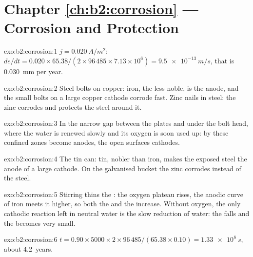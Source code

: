 \section*{Chapter \ref{ch:b2:corrosion} --- Corrosion and Protection}

\begin{solution}{exo:b2:corrosion:1}
$j = \qty{0.020}{A/m^2}$: $de/dt = 0.020 \times 65.38/(2 \times 96\,485 \times 7.13
\times 10^6) = \qty{9.5e-13}{m/s}$, that is \qty{0.030}{mm} per year.
\end{solution}

\begin{solution}{exo:b2:corrosion:2}
Steel bolts on copper: iron, the less noble, is the anode, and the small bolts
on a large copper cathode corrode fast. Zinc nails in steel: the zinc corrodes
and protects the steel around it.
\end{solution}

\begin{solution}{exo:b2:corrosion:3}
In the narrow gap between the plates and under the bolt head, where the water
is renewed slowly and its oxygen is soon used up: by 
these confined zones become anodes, the open surfaces cathodes.
\end{solution}

\begin{solution}{exo:b2:corrosion:4}
The tin can: tin, nobler than iron, makes the exposed steel the anode of a
large cathode. On the galvanised bucket the zinc corrodes instead of the
steel.
\end{solution}

\begin{solution}{exo:b2:corrosion:5}
Stirring thins the : the oxygen plateau rises, the anodic curve
of iron meets it higher, so both the  and the  increase. Without oxygen, the only cathodic reaction left in neutral
water is the slow reduction of water: the  falls and the
 becomes very small.
\end{solution}

\begin{solution}{exo:b2:corrosion:6}
$t = 0.90 \times 5000 \times 2 \times 96\,485/(65.38 \times 0.10) = \qty{1.33e8}{s}$,
about \qty{4.2}{years}.
\end{solution}

